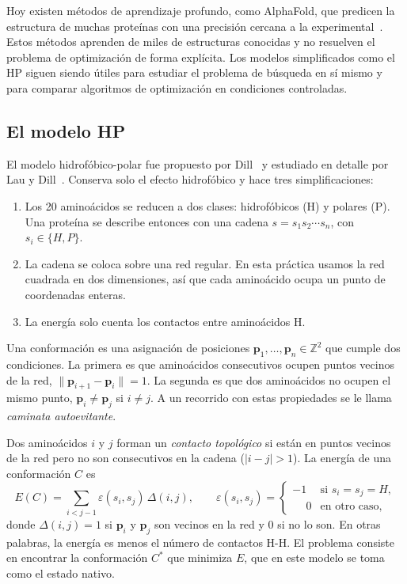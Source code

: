 Hoy existen métodos de aprendizaje profundo, como AlphaFold, que predicen la estructura de muchas proteínas con una precisión cercana a la experimental~\cite{jumper2021alphafold}. Estos métodos aprenden de miles de estructuras conocidas y no resuelven el problema de optimización de forma explícita. Los modelos simplificados como el HP siguen siendo útiles para estudiar el problema de búsqueda en sí mismo y para comparar algoritmos de optimización en condiciones controladas.

\subsection{El modelo HP}
\label{sec:modelo_hp}

El modelo hidrofóbico-polar fue propuesto por Dill~\cite{dill1985theory} y estudiado en detalle por Lau y Dill~\cite{lau1989lattice}. Conserva solo el efecto hidrofóbico y hace tres simplificaciones:

\begin{enumerate}
    \item Los 20 aminoácidos se reducen a dos clases: hidrofóbicos (H) y polares (P). Una proteína se describe entonces con una cadena $s = s_1 s_2 \cdots s_n$, con $s_i \in \{H, P\}$.
    \item La cadena se coloca sobre una red regular. En esta práctica usamos la red cuadrada en dos dimensiones, así que cada aminoácido ocupa un punto de coordenadas enteras.
    \item La energía solo cuenta los contactos entre aminoácidos H.
\end{enumerate}

Una conformación es una asignación de posiciones $\mathbf{p}_1, \dots, \mathbf{p}_n \in \mathbb{Z}^2$ que cumple dos condiciones. La primera es que aminoácidos consecutivos ocupen puntos vecinos de la red, $\lVert \mathbf{p}_{i+1} - \mathbf{p}_i \rVert = 1$. La segunda es que dos aminoácidos no ocupen el mismo punto, $\mathbf{p}_i \neq \mathbf{p}_j$ si $i \neq j$. A un recorrido con estas propiedades se le llama \textit{caminata autoevitante}.

Dos aminoácidos $i$ y $j$ forman un \textit{contacto topológico} si están en puntos vecinos de la red pero no son consecutivos en la cadena ($|i - j| > 1$). La energía de una conformación $C$ es
\begin{equation}
E(C) = \sum_{i < j - 1} \varepsilon(s_i, s_j)\, \Delta(i, j),
\qquad
\varepsilon(s_i, s_j) =
\begin{cases}
-1 & \text{si } s_i = s_j = H,\\
\phantom{-}0 & \text{en otro caso,}
\end{cases}
\label{eq:energia_hp}
\end{equation}
donde $\Delta(i,j) = 1$ si $\mathbf{p}_i$ y $\mathbf{p}_j$ son vecinos en la red y 0 si no lo son. En otras palabras, la energía es menos el número de contactos H-H. El problema consiste en encontrar la conformación $C^*$ que minimiza $E$, que en este modelo se toma como el estado nativo.

